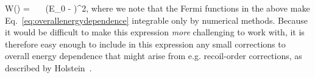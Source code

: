 \beq
W(\Ebeta) =  \, \FF \, \xi \, \pe \Ee (E_0 - \Ee)^2, 
\label{eq:overallenergydependence}
\eeq
where we note that the Fermi functions in the above make Eq.~\ref{eq:overallenergydependence} integrable only by numerical methods.  Because it would be difficult to make this expression \emph{more} challenging to work with, it is therefore easy enough to include in this expression any small corrections to overall energy dependence that might arise from e.g.\! recoil-order corrections, as described by Holstein~\cite{holstein}.

